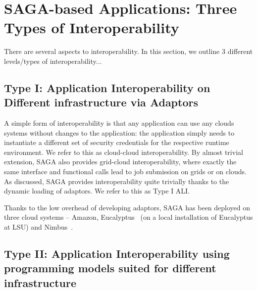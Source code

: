 \documentclass[3p,twocolumn]{elsarticle}
\begin{document}


\section{SAGA-based Applications: Three Types of Interoperability}
\label{sec:interop}

There are several aspects to interoperability. In this section, we
outline
3 different levels/types of interoperability...


\subsection{Type I: Application Interoperability on Different
  infrastructure via Adaptors}

A simple form of interoperability is that any application can use any
clouds systems without changes to the application: the application
simply needs to instantiate a different set of security credentials
for the respective runtime environment. We refer to this as
cloud-cloud interoperability. By almost trivial extension, SAGA also
provides grid-cloud interoperability, where exactly the same interface
and functional calls lead to job submission on grids or on clouds.  As
discussed, SAGA provides interoperability quite trivially thanks to
the dynamic loading of adaptors.  We refer to this as Type I ALI.

Thanks to the low overhead of developing adaptors, SAGA has been
deployed on three cloud systems -- Amazon,
Eucalyptus~\cite{eucalyptus} (on a local installation of Eucalyptus at
LSU) and Nimbus~\cite{nimbus}.




\subsection{Type II: Application Interoperability using programming
  models suited for different infrastructure}

\end{document}
